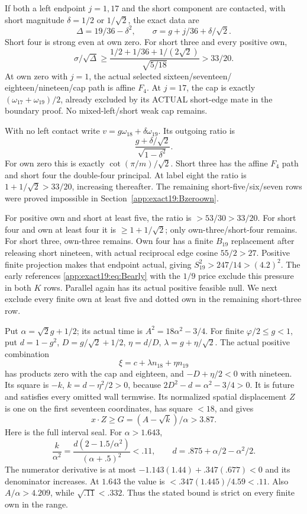 If both a left endpoint \(j=1,17\)
and the short component are
contacted, with short magnitude
\(\delta=1/2\) or \(1/\sqrt2\),
the exact data are
\[
             \Delta=19/36-\delta^2,\qquad
             \sigma=g+j/36+\delta/\sqrt2 .
\]
Short four is strong even at
own zero.
For short three and every
positive own,
\[
 \sigma/\sqrt\Delta\ge
 \frac{1/2+1/36+1/(2\sqrt2)}{\sqrt{5/18}}>33/20 .
\]
At own zero with \(j=1\), the
actual selected sixteen/seventeen/
eighteen/nineteen/cap path is
affine \(F_4\).
At \(j=17\), the cap is exactly
\((\omega_{17}+\omega_{19})/2\),
already excluded by its ACTUAL
short-edge mate in the boundary
proof.
No mixed-left/short weak cap
remains.

With no left contact write
\(v=g\omega_{18}+\delta\omega_{19}\).
Its outgoing ratio is
\[
                         \frac{g+\delta/\sqrt2}{\sqrt{1-\delta^2}} .
\]
For own zero this is exactly
\(\cot(\pi/m)/\sqrt2\).
Short three has the affine \(F_4\)
path and short four the double-four
principal.
At label eight the ratio is
\(1+1/\sqrt2>33/20\), increasing
thereafter.
The remaining short-five/six/seven
rows were proved impossible in
Section~\ref{app:exact19:Bzeroown}.

For positive own and short at
least five, the ratio is
\(>53/30>33/20\).
For short four and own at least
four it is \(\ge1+1/\sqrt2\);
only own-three/short-four remains.
For short three, own-three remains.
Own four has a finite \(B_{19}\)
replacement after releasing short
nineteen, with actual reciprocal
edge cosine \(55/2>27\).
Positive finite projection makes
that endpoint actual, giving
\(S_{19}^2>247/14>(4.2)^2\).
The early references
\eqref{app:exact19:eq:Bearly}
with the \(1/9\) price exclude
this pressure in both \(K\) rows.
Parallel again has its actual
positive feasible null.
We next exclude every finite
own at least five and dotted
own in the remaining short-three
row.

Put \(\alpha=\sqrt2g+1/2\);
its actual time is
\(A^2=18\alpha^2-3/4\).
For finite \(\varphi/2\le g<1\),
put \(d=1-g^2\), \(D=g/\sqrt2+1/2\),
\(\eta=d/D\), \(\lambda=g+\eta/\sqrt2\).
The actual positive combination
\[
                             \xi=c+\lambda n_{18}+\eta n_{19}
\]
has products zero with the cap
and eighteen, and
\(-D+\eta/2<0\) with nineteen.
Its square is \(-k\),
\(k=d-\eta^2/2>0\), because
\(2D^2-d=\alpha^2-3/4>0\).
It is future and satisfies every
omitted wall termwise.
Its normalized spatial displacement
\(Z\) is one on the first seventeen
coordinates, has square \(<18\),
and gives
\[
                 x\cdot Z\ge G=(A-\sqrt k)/\alpha>3.87 .
\]
Here is the full interval seal.
For \(\alpha>1.643\),
\[
 \frac{k}{\alpha^2}
   =\frac{d(2-1.5/\alpha^2)}{(\alpha+.5)^2}<.11,
 \qquad d=.875+\alpha/2-\alpha^2/2 .
\]
The numerator derivative is at
most \(-1.143(1.44)+.347(.677)<0\)
and its denominator increases.
At \(1.643\) the value is
\(<.347(1.445)/4.59<.11\).
Also \(A/\alpha>4.209\), while
\(\sqrt{.11}<.332\).
Thus the stated bound is strict
on every finite own in the range.

